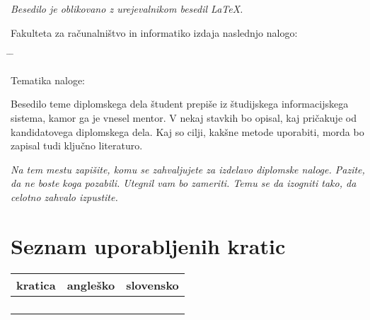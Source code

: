 \documentclass[a4paper, 12pt]{book}
\newcommand{\clearemptydoublepage}{\newpage{\pagestyle{empty}\cleardoublepage}}
\begin{document}
\begin{center}
\mbox{}\vfill
\emph{Besedilo je oblikovano z urejevalnikom besedil \LaTeX.}
\end{center}
\clearemptydoublepage

\thispagestyle{empty}
\vspace*{4cm}

\noindent
Fakulteta za računalništvo in informatiko izdaja naslednjo nalogo:
\medskip
\begin{tabbing}
\hspace{32mm}\= \hspace{6cm} \= \kill

Tematika naloge:
\end{tabbing}
Besedilo teme diplomskega dela študent prepiše iz študijskega informacijskega sistema, kamor ga je vnesel mentor. V nekaj stavkih bo opisal, kaj pričakuje od kandidatovega diplomskega dela. Kaj so cilji, kakšne metode uporabiti, morda bo zapisal tudi ključno literaturo.
\vspace{15mm}

\vspace{2cm}

\clearemptydoublepage

\thispagestyle{empty}\mbox{}\vfill\null\it%
\noindent
Na tem mestu zapišite, komu se zahvaljujete za izdelavo diplomske naloge. Pazite, da ne boste koga pozabili. Utegnil vam bo zameriti. Temu se da izogniti tako, da celotno zahvalo izpustite.
\rm\normalfont

\clearemptydoublepage

\pagestyle{empty}
\def\thepage{}%
\tableofcontents{}

\clearemptydoublepage


\chapter*{Seznam uporabljenih kratic}  %

\noindent\begin{tabular}{p{}|p{}|p{}}    %
  {\bf kratica} & {\bf angleško}                             & {\bf slovensko} \\ \hline
  {\bf } & \\
  {\bf } & \\
  {\bf } & \\
  {\bf } & \\
\end{tabular}
\end{document}
